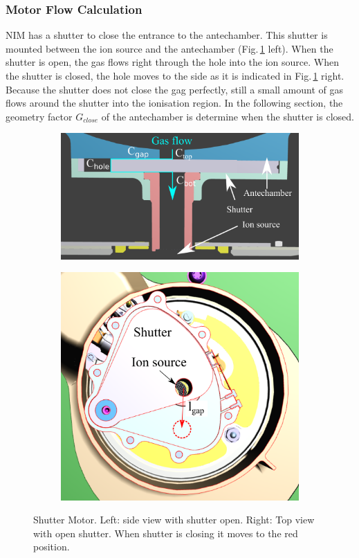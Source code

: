		\subsubsection{Motor Flow Calculation} \label{subsubsec:motorflow}
		NIM has a shutter to close the entrance to the antechamber. This shutter is mounted between the ion source and the antechamber (Fig.\,\ref{fig:shutterMotor} left). When the shutter is open, the gas flows right through the hole into the ion source. When the shutter is closed, the hole moves to the side as it is indicated in Fig.\,\ref{fig:shutterMotor} right. Because the shutter does not close the gag perfectly, still a small amount of gas flows around the shutter into the ionisation region. In the following section, the geometry factor $G_{close}$ of the antechamber is determine when the shutter is closed.\\
		\begin{figure}[h!]
			\begin{subfigure}{0.5\textwidth}
				\centering
				\includegraphics[width=\textwidth]{Bilder/Shutter_sideview.png}
			\end{subfigure}
			\begin{subfigure}{0.5\textwidth}
				\centering
				\includegraphics[width=.8\textwidth]{Bilder/Shutter_topview.png}
			\end{subfigure}
		\caption{Shutter Motor. Left: side view with shutter open. Right: Top view with open shutter. When shutter is closing it moves to the red position.}
		\label{fig:shutterMotor}
		\end{figure}
